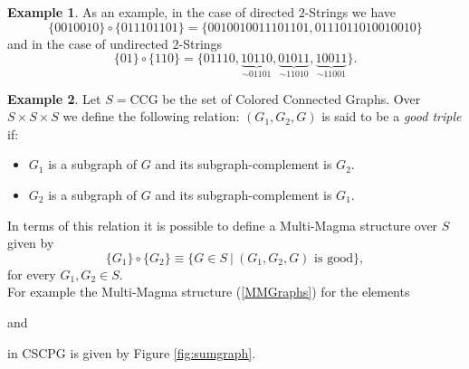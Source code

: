 \documentclass[letterpaper,12pt]{article}
\theoremstyle{definition}
\newtheorem{exmp}{Example}[section]
\begin{document}
\begin{exmp}
As an example, in the case of directed $2$-Strings we have 
\begin{equation*}
    \{0010010\} \circ \{011101101\} = \{0010010011101101,0111011010010010 \}
\end{equation*}
and in the case of undirected $2$-Strings
\begin{equation*}
    \{01\} \circ \{110\}=\{01110, \underbrace{10110}_{\sim 01101}, \underbrace{01011}_{\sim 11010}, \underbrace{10011}_{\sim 11001} \}.
\end{equation*}
\end{exmp}

\begin{exmp}\label{exmgraphs}
Let $S=\text{CCG}$ be the set of Colored Connected Graphs. Over $S \times S \times S$ we define the following relation: $(G_1,G_2,G)$ is said to be a \textit{good triple} if:
\begin{itemize}
    \item $G_1$ is a subgraph of $G$ and its subgraph-complement is $G_2$.
    \item $G_2$ is a subgraph of $G$ and its subgraph-complement is $G_1$.
\end{itemize}
In terms of this relation it is possible to define a Multi-Magma structure over $S$ given by 
    \begin{equation}\label{MMGraphs}
        \{G_1\} \circ \{G_2\} \equiv \{G \in S \ | \ (G_1,G_2,G) \text{ is good}\},
    \end{equation}
for every $G_1,G_2 \in S$.  \\
For example the Multi-Magma structure (\ref{MMGraphs}) for the elements
 and 
 in CSCPG is given by Figure \ref{fig:sumgraph}.


\end{exmp}
\end{document}
